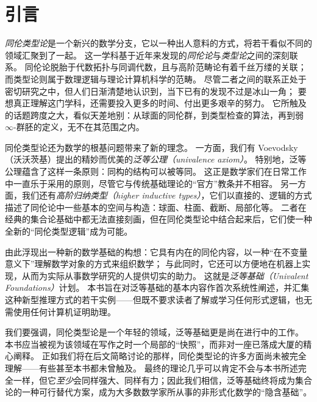 \chapter*{引言}
\setcounter{page}{1}

\emph{同伦类型论}是一个新兴的数学分支，它以一种出人意料的方式，将若干看似不同的领域汇聚到了一起。
这一学科基于近年来发现的\emph{同伦论}与\emph{类型论}之间的深刻联系。
同伦论脱胎于代数拓扑与同调代数，且与高阶范畴论有着千丝万缕的关联；而类型论则属于数理逻辑与理论计算机科学的范畴。
尽管二者之间的联系正处于密切研究之中，但人们日渐清楚地认识到，当下已有的发现不过是冰山一角；
要想真正理解这门学科，还需要投入更多的时间、付出更多艰辛的努力。
它所触及的话题跨度之大，看似天差地别：从球面的同伦群，到类型检查的算法，再到弱 $\infty$-群胚的定义，无不在其范围之内。

同伦类型论还为数学的根基问题带来了新的理念。
%
一方面，我们有 Voevodsky （沃沃茨基）提出的精妙而优美的\emph{泛等公理（univalence axiom）}。
%
特别地，泛等公理蕴含了这样一条原则：同构的结构可以被等同。
这正是数学家们在日常工作中一直乐于采用的原则，尽管它与传统基础理论的“官方”教条并不相容。
另一方面，我们还有\emph{高阶归纳类型（higher inductive types）}，它们以直接的、逻辑的方式描述了同伦论中一些基本的空间与构造：球面、柱面、截断、局部化等。
二者在经典的集合论基础中都无法直接刻画，但在同伦类型论中结合起来后，它们使一种全新的“同伦类型逻辑”成为可能。
%

由此浮现出一种新的数学基础的构想：它具有内在的同伦内容，以一种“在不变量意义下”理解数学对象的方式来组织数学；
与此同时，它还可以方便地在机器上实现，从而为实际从事数学研究的人提供切实的助力。
这就是\emph{泛等基础（Univalent Foundations）}计划。
本书旨在对泛等基础的基本内容作首次系统性阐述，并汇集这种新型推理方式的若干实例——但既不要求读者了解或学习任何形式逻辑，也无需使用任何计算机证明助理。

\OPTwidow

我们要强调，同伦类型论是一个年轻的领域，泛等基础更是尚在进行中的工作。
本书应当被视为该领域在写作之时一个局部的“快照”，而非对一座已落成大厦的精心阐释。
正如我们将在后文简略讨论的那样，同伦类型论的许多方面尚未被完全理解——有些甚至本书都未曾触及。
最终的理论几乎可以肯定不会与本书所述完全一样，但它\emph{至少}会同样强大、同样有力；因此我们相信，泛等基础终将成为集合论的一种可行替代方案，成为大多数数学家所从事的非形式化数学的“隐含基础”。

